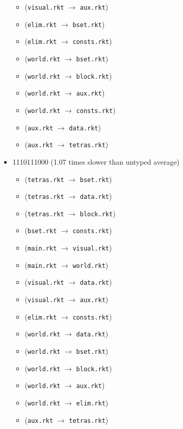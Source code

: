 \documentclass{article}
\newcommand{\mono}[1]{\texttt{#1}}
\begin{document}
\begin{itemize}
\begin{itemize}
  \item (\mono{visual.rkt} $\rightarrow$ \mono{aux.rkt})
  \item (\mono{elim.rkt} $\rightarrow$ \mono{bset.rkt})
  \item (\mono{elim.rkt} $\rightarrow$ \mono{consts.rkt})
  \item (\mono{world.rkt} $\rightarrow$ \mono{bset.rkt})
  \item (\mono{world.rkt} $\rightarrow$ \mono{block.rkt})
  \item (\mono{world.rkt} $\rightarrow$ \mono{aux.rkt})
  \item (\mono{world.rkt} $\rightarrow$ \mono{consts.rkt})
  \item (\mono{aux.rkt} $\rightarrow$ \mono{data.rkt})
  \item (\mono{aux.rkt} $\rightarrow$ \mono{tetras.rkt})
  \end{itemize}
\item 1110111000 (1.07 times slower than untyped average)
  \begin{itemize}
  \item (\mono{tetras.rkt} $\rightarrow$ \mono{bset.rkt})
  \item (\mono{tetras.rkt} $\rightarrow$ \mono{data.rkt})
  \item (\mono{tetras.rkt} $\rightarrow$ \mono{block.rkt})
  \item (\mono{bset.rkt} $\rightarrow$ \mono{consts.rkt})
  \item (\mono{main.rkt} $\rightarrow$ \mono{visual.rkt})
  \item (\mono{main.rkt} $\rightarrow$ \mono{world.rkt})
  \item (\mono{visual.rkt} $\rightarrow$ \mono{data.rkt})
  \item (\mono{visual.rkt} $\rightarrow$ \mono{aux.rkt})
  \item (\mono{elim.rkt} $\rightarrow$ \mono{consts.rkt})
  \item (\mono{world.rkt} $\rightarrow$ \mono{data.rkt})
  \item (\mono{world.rkt} $\rightarrow$ \mono{bset.rkt})
  \item (\mono{world.rkt} $\rightarrow$ \mono{block.rkt})
  \item (\mono{world.rkt} $\rightarrow$ \mono{aux.rkt})
  \item (\mono{world.rkt} $\rightarrow$ \mono{elim.rkt})
  \item (\mono{aux.rkt} $\rightarrow$ \mono{tetras.rkt})
  \end{itemize}

\end{itemize}
\end{document}

